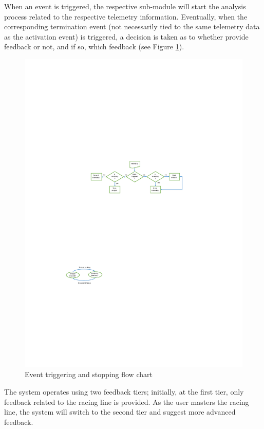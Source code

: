 When an event is triggered, the respective sub-module will start the analysis process related to the respective telemetry information. Eventually, when the corresponding termination event (not necessarily tied to the same telemetry data as the activation event) is triggered, a decision is taken as to whether provide feedback or not, and if so, which feedback (see Figure \ref{fig:feedback-events}).

\begin{figure}[!htb]
	\centering
	\includegraphics[width=\textwidth]{diagrams/feedbackEvent.pdf}
	\caption{Event triggering and stopping flow chart}
	\label{fig:feedback-events}
\end{figure}

The system operates using two feedback tiers; initially, at the first tier, only feedback related to the racing line is provided. As the user masters the racing line, the system will switch to the second tier and suggest more advanced feedback.

